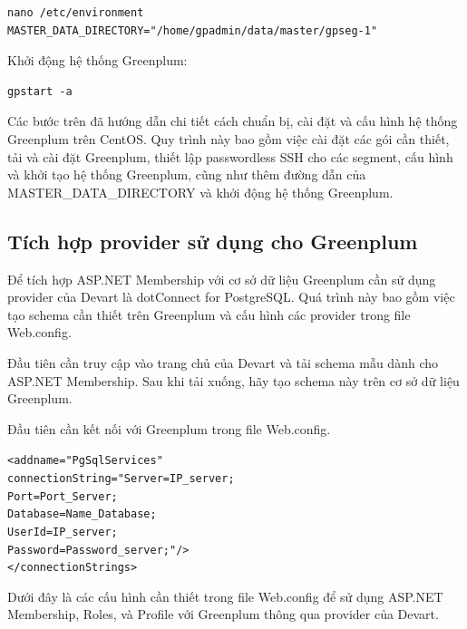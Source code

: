 \documentclass[14pt]{article}
\begin{document}
\begin{verbatim}
nano /etc/environment
MASTER_DATA_DIRECTORY="/home/gpadmin/data/master/gpseg-1"
\end{verbatim}

Khởi động hệ thống Greenplum:

\begin{verbatim}
gpstart -a
\end{verbatim}

Các bước trên đã hướng dẫn chi tiết cách chuẩn bị, cài đặt và cấu hình hệ thống Greenplum trên CentOS. Quy trình này bao gồm việc cài đặt các gói cần thiết, tải và cài đặt Greenplum, thiết lập passwordless SSH cho các segment, cấu hình và khởi tạo hệ thống Greenplum, cũng như thêm đường dẫn của MASTER\_DATA\_DIRECTORY và khởi động hệ thống Greenplum.



\subsection{Tích hợp provider sử dụng cho Greenplum}

Để tích hợp ASP.NET Membership với cơ sở dữ liệu Greenplum cần sử dụng provider của Devart là dotConnect for PostgreSQL. Quá trình này bao gồm việc tạo schema cần thiết trên Greenplum và cấu hình các provider trong file Web.config.

Đầu tiên cần truy cập vào trang chủ của Devart và tải schema mẫu dành cho ASP.NET Membership. Sau khi tải xuống, hãy tạo schema này trên cơ sở dữ liệu Greenplum.

Đầu tiên cần kết nối với Greenplum trong file Web.config.


\begin{mdframed}[backgroundcolor=white, linecolor=black, roundcorner=5pt]
\begin{alltt}
<add name="PgSqlServices" 
     connectionString="Server=IP_server;
                       Port=Port_Server;
                       Database=Name_Database;
                       User Id=IP_server;
                       Password=Password_server;"/>
</connectionStrings>
\end{alltt}
\end{mdframed}

Dưới đây là các cấu hình cần thiết trong file Web.config để sử dụng ASP.NET Membership, Roles, và Profile với Greenplum thông qua provider của Devart.
\end{document}

